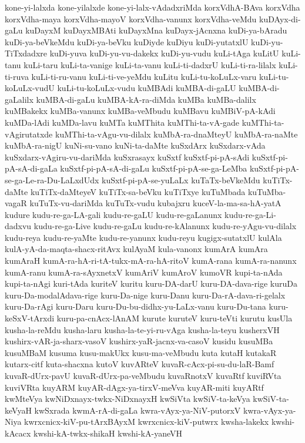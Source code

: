 {kone-yi-lalxda
kone-yilalxde
kone-yi-lalx-vAdadxriMda
korxVdhA-BAva
korxVdha
korxVdha-maya
korxVdha-mayoV
korxVdha-vanunx
korxVdha-veMdu
kuDAyx-di-gaLu
kuDayxM
kuDayxMBAti
kuDayxMna
kuDayx-jAcnxna
kuDi-ya-bAradu
kuDi-ya-beVkeMdu
kuDi-ya-beVku
kuDiyde
kuDiyu
kuDi-yutatxlU
kuDi-yu-TiTxdadxre
kuDi-yuva
kuDi-yu-vu-dakekx
kuDi-yu-vudu
kuLi-tAga
kuLitU
kuLi-tanu
kuLi-taru
kuLi-ta-vanige
kuLi-ta-vanu
kuLi-ti-dadxrU
kuLi-ti-ra-lilalx
kuLi-ti-ruva
kuLi-ti-ru-vanu
kuLi-ti-ve-yeMdu
kuLitu
kuLi-tu-koLuLx-varu
kuLi-tu-koLuLx-vudU
kuLi-tu-koLuLx-vudu
kuMBAdi
kuMBA-di-gaLU
kuMBA-di-gaLalilx
kuMBA-di-gaLu
kuMBA-kA-ra-diMda
kuMBa
kuMBa-dalilx
kuMBakekx
kuMBa-vanunx
kuMBa-veMbudu
kuMBavu
kuMBiV-pA-kAdi
kuMDa-lAdi
kuMDa-lavu
kuMTa
kuMThita
kuMThi-ta-vA-gade
kuMThi-ta-vAgirutatxde
kuMThi-ta-vAgu-vu-dilalx
kuMbA-ra-dnaMteyU
kuMbA-ra-naMte
kuMbA-ra-nigU
kuNi-su-vano
kuNi-ta-daMte
kuSxdArx
kuSxdarx-vAda
kuSxdarx-vAgiru-vu-dariMda
kuSxrasayx
kuSxtf
kuSxtf-pi-pA-sAdi
kuSxtf-pi-pA-sA-di-gaLa
kuSxtf-pi-pA-sA-di-gaLu
kuSxtf-pi-pA-se-ga-LeMba
kuSxtf-pi-pA-se-ga-Le-ra-Du-LaLxdUdx
kuSxtf-pi-pA-se-yuLaLx
kuTaTx-beVkeMdu
kuTiTx-daMte
kuTiTx-daMteyeV
kuTiTx-sa-beVku
kuTiTxye
kuTuMbada
kuTuMba-vagaR
kuTuTx-vu-dariMda
kuTuTx-vudu
kubajxru
kuceV-la-ma-sa-hA-yatA
kudure
kudu-re-ga-LA-gali
kudu-re-gaLU
kudu-re-gaLanunx
kudu-re-ga-Li-dadxvu
kudu-re-ga-Live
kudu-re-gaLu
kudu-re-kAlanunx
kudu-re-yAgu-vu-dilalx
kudu-reya
kudu-re-yaMte
kudu-re-yanunx
kudu-reyu
kugigx-sutatxlU
kulAla
kulA-yA-da-maqta-shacx-ritAvx
kulAyaM
kula-vanonx
kumArA
kumAra
kumAraH
kumA-ra-hA-ri-tA-tukx-mA-ra-hA-ritoV
kumA-rana
kumA-ra-nanunx
kumA-ranu
kumA-ra-sAyxnetxV
kumAriV
kumAroV
kumoVR
kupi-ta-nAda
kupi-ta-nAgi
kuri-tAda
kuriteV
kuritu
kuru-DA-darU
kuru-DA-dava-rige
kuruDa
kuru-Da-modalAdava-rige
kuru-Da-nige
kuru-Danu
kuru-Da-rA-dava-ri-gelalx
kuru-Da-rAgi
kuru-Daru
kuru-Du-bu-didhx-yu-LaLx-vanu
kuru-Du-tana
kuru-keSxV-tArxdi
kuru-pa-cnAcx-lAnAM
kurute
kuruteV
kuru-teVti
kurutu
kusUla
kusha-la-reMdu
kusha-laru
kusha-la-te-yi-ru-vAga
kusha-la-teyu
kusherxVH
kushirx-vAR-ja-sharx-vasoV
kushirx-yaR-jacnx-va-casoV
kusidu
kusuMBa
kusuMBaM
kusuma
kusu-makUkx
kusu-ma-veMbudu
kuta
kutaH
kutakaR
kutarx-citf
kuta-shacxna
kutoV
kuvARteV
kuvaR-cAcx-pi-su-du-laR-Bamf
kuvaR-dUrx-pavU
kuvaR-dUrx-pa-veMbudu
kuvaRnotxV
kuvaRtf
kuviRVta
kuviVRta
kuyARM
kuyAR-dAgx-ya-tirxV-meVva
kuyAR-miti
kuyARtf
kwMteVya
kwNiDxnayx-twkx-NiDxnayxH
kwSiVta
kwSiV-ta-keVya
kwSiV-ta-keVyaH
kwSxrada
kwmA-rA-di-gaLa
kwra-vAyx-ya-NiV-putorxV
kwra-vAyx-ya-Niya
kwrxcnicx-kiV-pu-tArxBAyxM
kwrxcnicx-kiV-putwrx
kwsha-lakekx
kwshi-kAcacx
kwshi-kA-twkx-shikaH
kwshi-kA-yaneVH
}
